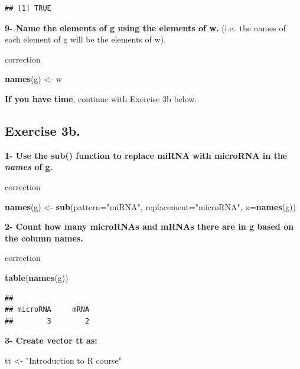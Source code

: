 \documentclass[]{book}
\newenvironment{Shaded}{\begin{snugshade}}{\end{snugshade}}
\newcommand{\DataTypeTok}[1]{\textcolor[rgb]{0.13,0.29,0.53}{#1}}
\newcommand{\KeywordTok}[1]{\textcolor[rgb]{0.13,0.29,0.53}{\textbf{#1}}}
\newcommand{\NormalTok}[1]{#1}
\newcommand{\StringTok}[1]{\textcolor[rgb]{0.31,0.60,0.02}{#1}}
\begin{document}
\begin{verbatim}
## [1] TRUE
\end{verbatim}

\textbf{9- Name the elements of g using the elements of w.}
(i.e.~the names of each element of g will be the elements of w).

correction

\begin{Shaded}
\begin{Highlighting}[]
\KeywordTok{names}\NormalTok{(g) <-}\StringTok{ }\NormalTok{w}
\end{Highlighting}
\end{Shaded}

\textbf{If you have time}, continue with Exercise 3b below.

\hypertarget{exercise-3b.}{%
\subsection{Exercise 3b.}\label{exercise-3b.}}

\textbf{1- Use the sub() function to replace miRNA with microRNA in the \emph{names} of g.}

correction

\begin{Shaded}
\begin{Highlighting}[]
\KeywordTok{names}\NormalTok{(g) <-}\StringTok{ }\KeywordTok{sub}\NormalTok{(}\DataTypeTok{pattern=}\StringTok{"miRNA"}\NormalTok{, }\DataTypeTok{replacement=}\StringTok{"microRNA"}\NormalTok{, }\DataTypeTok{x=}\KeywordTok{names}\NormalTok{(g))}
\end{Highlighting}
\end{Shaded}

\textbf{2- Count how many microRNAs and mRNAs there are in g based on the column names.}

correction

\begin{Shaded}
\begin{Highlighting}[]
\KeywordTok{table}\NormalTok{(}\KeywordTok{names}\NormalTok{(g))}
\end{Highlighting}
\end{Shaded}

\begin{verbatim}
## 
## microRNA     mRNA 
##        3        2
\end{verbatim}

\textbf{3- Create vector tt as:}

\begin{Shaded}
\begin{Highlighting}[]
\NormalTok{tt <-}\StringTok{ "Introduction to R course"}
\end{Highlighting}
\end{Shaded}
\end{document}
